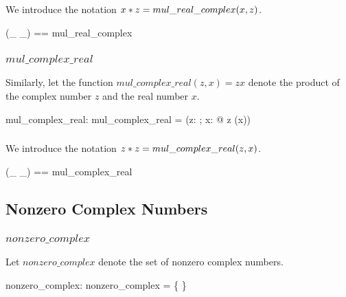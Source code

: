 \documentclass[11pt, oneside]{article}
\begin{document}
\subsubsection{}

We introduce the notation $x \mathbin{*} z = mul\_real\_complex(x, z)$.

\begin{zed}
	(\_ \mulRC \_) == mul\_real\_complex
\end{zed}

\subsubsection{$mul\_complex\_real$}

Similarly, let the function $mul\_complex\_real(z, x) = zx$ denote the product of the complex number $z$ and
the real number $x$.

\begin{axdef}
	mul\_complex\_real: \C \cross \R \fun \C
\where
	mul\_complex\_real = (\lambda z: \C; x: \R @ z \mulC (\asRC x))
\end{axdef}

\subsubsection{}

We introduce the notation $z \mathbin{*} z = mul\_complex\_real(z, x)$.

\begin{zed}
	(\_ \mulCR \_) == mul\_complex\_real
\end{zed}

\subsection{Nonzero Complex Numbers}

\subsubsection{$nonzero\_complex$}

Let $nonzero\_complex$ denote the set of nonzero complex numbers.

\begin{axdef}
	nonzero\_complex: \power \C
\where
	nonzero\_complex = \C \setminus \{ \zeroC \}
\end{axdef}

\subsubsection{}
\end{document}
